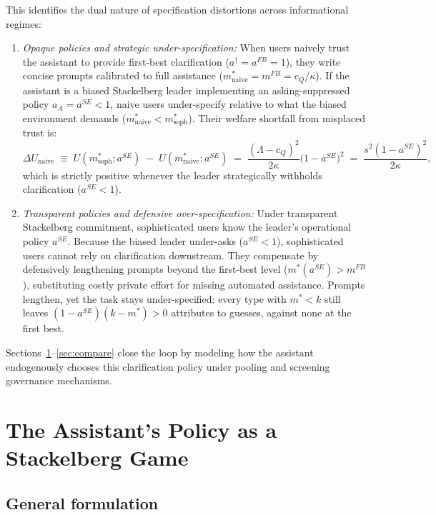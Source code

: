 \documentclass[11pt]{article}
\begin{document}
This identifies the dual nature of specification distortions across informational regimes:
\begin{enumerate}[leftmargin=*]
\item \emph{Opaque policies and strategic under-specification:} When users naively trust the assistant to provide first-best clarification ($a^\dagger = a^{FB} = 1$), they write concise prompts calibrated to full assistance ($m^*_{\text{naive}} = m^{FB} = c_Q/\kappa$). If the assistant is a biased Stackelberg leader implementing an asking-suppressed policy $a_A = a^{SE} < 1$, naive users under-specify relative to what the biased environment demands ($m^*_{\text{naive}} < m^*_{\text{soph}}$). Their welfare shortfall from misplaced trust is:
\[
\Delta U_{\text{naive}} \;\equiv\; U(m^*_{\text{soph}}; a^{SE}) \;-\; U(m^*_{\text{naive}}; a^{SE}) \;=\; \frac{(\Lambda - c_Q)^2}{2\kappa}\big(1 - a^{SE}\big)^2 \;=\; \frac{s^2 (1 - a^{SE})^2}{2\kappa},
\]
which is strictly positive whenever the leader strategically withholds clarification ($a^{SE} < 1$).
\item \emph{Transparent policies and defensive over-specification:} Under transparent Stackelberg commitment, sophisticated users know the leader's operational policy $a^{SE}$. Because the biased leader under-asks ($a^{SE} < 1$), sophisticated users cannot rely on clarification downstream. They compensate by defensively lengthening prompts beyond the first-best level ($m^*(a^{SE}) > m^{FB}$), substituting costly private effort for missing automated assistance. Prompts lengthen, yet the task stays under-specified: every type with $m^* < k$ still leaves $(1 - a^{SE})(k - m^*) > 0$ attributes to guesses, against none at the first best.
\end{enumerate}
Sections~\ref{sec:stackelberg}--\ref{sec:compare} close the loop by modeling how the assistant endogenously chooses this clarification policy under pooling and screening governance mechanisms.

\section{The Assistant's Policy as a Stackelberg Game}
\label{sec:stackelberg}

\subsection{General formulation}
\label{sec:formulation}
\end{document}
